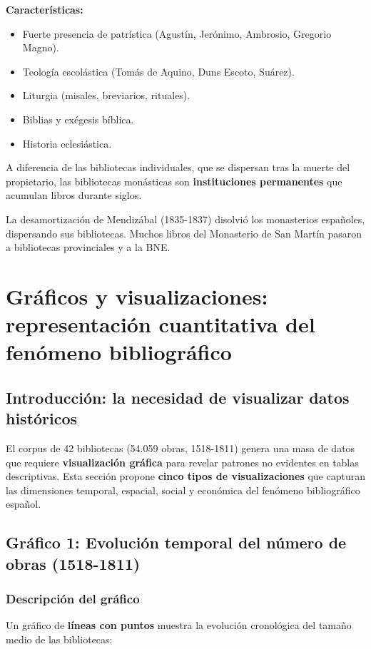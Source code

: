 \documentclass[11pt,a4paper]{article}
\begin{document}
\textbf{Características:}
\begin{itemize}
\item Fuerte presencia de patrística (Agustín, Jerónimo, Ambrosio, Gregorio Magno).
\item Teología escolástica (Tomás de Aquino, Duns Escoto, Suárez).
\item Liturgia (misales, breviarios, rituales).
\item Biblias y exégesis bíblica.
\item Historia eclesiástica.
\end{itemize}

A diferencia de las bibliotecas individuales, que se dispersan tras la muerte del propietario, las bibliotecas monásticas son \textbf{instituciones permanentes} que acumulan libros durante siglos.

La desamortización de Mendizábal (1835-1837) disolvió los monasterios españoles, dispersando sus bibliotecas. Muchos libros del Monasterio de San Martín pasaron a bibliotecas provinciales y a la BNE.

\section{Gráficos y visualizaciones: representación cuantitativa del fenómeno bibliográfico}

\subsection{Introducción: la necesidad de visualizar datos históricos}

El corpus de 42 bibliotecas (54.059 obras, 1518-1811) genera una masa de datos que requiere \textbf{visualización gráfica} para revelar patrones no evidentes en tablas descriptivas. Esta sección propone \textbf{cinco tipos de visualizaciones} que capturan las dimensiones temporal, espacial, social y económica del fenómeno bibliográfico español.

\subsection{Gráfico 1: Evolución temporal del número de obras (1518-1811)}

\subsubsection{Descripción del gráfico}

Un gráfico de \textbf{líneas con puntos} muestra la evolución cronológica del tamaño medio de las bibliotecas:
\end{document}
